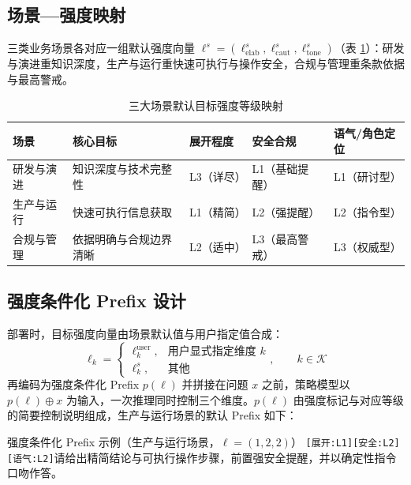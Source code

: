 \documentclass[fontset=fandol,type=master,campus=shenzhen,etitleauto=true]{hithesisbook}
\begin{document}
\subsection{场景---强度映射}\label{ux573aux666fux5f3aux5ea6ux6620ux5c04}

三类业务场景各对应一组默认强度向量 $\boldsymbol{\ell}^{s} = (\ell^{s}_{\text{elab}}, \ell^{s}_{\text{caut}}, \ell^{s}_{\text{tone}})$（表 \ref{tab:scene-intensity-map}）：研发与演进重知识深度，生产与运行重快速可执行与操作安全，合规与管理重条款依据与最高警戒。

\begin{table}[htbp]
\centering
\caption{三大场景默认目标强度等级映射}
\label{tab:scene-intensity-map}
\small
\renewcommand{\arraystretch}{1.1}
\begin{tabular}{p{2.2cm}p{3.0cm}p{1.6cm}p{2.4cm}p{2.6cm}}
\toprule
\textbf{场景} & \textbf{核心目标} & \textbf{展开程度} & \textbf{安全合规} & \textbf{语气/角色定位} \\
\midrule
研发与演进 & 知识深度与技术完整性 & L3（详尽） & L1（基础提醒） & L1（研讨型） \\
生产与运行 & 快速可执行信息获取 & L1（精简） & L2（强提醒） & L2（指令型） \\
合规与管理 & 依据明确与合规边界清晰 & L2（适中） & L3（最高警戒） & L3（权威型） \\
\bottomrule
\end{tabular}
\end{table}

\subsection{强度条件化 Prefix 设计}\label{ux5f3aux5ea6ux6761ux4ef6ux5316-prefix-ux8bbeux8ba1}

部署时，目标强度向量由场景默认值与用户指定值合成：
\begin{equation}\label{eq:target-intensity}
\ell_k = \begin{cases} \ell_k^{\text{user}}, & \text{用户显式指定维度 } k \\ \ell_k^{s}, & \text{其他} \end{cases}, \qquad k \in \mathcal{K}
\end{equation}
再编码为强度条件化 Prefix $p(\boldsymbol{\ell})$ 并拼接在问题 $x$ 之前，策略模型以 $p(\boldsymbol{\ell}) \oplus x$ 为输入，一次推理同时控制三个维度。$p(\boldsymbol{\ell})$ 由强度标记与对应等级的简要控制说明组成，生产与运行场景的默认 Prefix 如下：

\begin{promptbox}{强度条件化 Prefix 示例（生产与运行场景，$\boldsymbol{\ell} = (1, 2, 2)$）}
\texttt{[展开:L1][安全:L2][语气:L2]}\quad 请给出精简结论与可执行操作步骤，前置强安全提醒，并以确定性指令口吻作答。
\end{promptbox}
\end{document}
